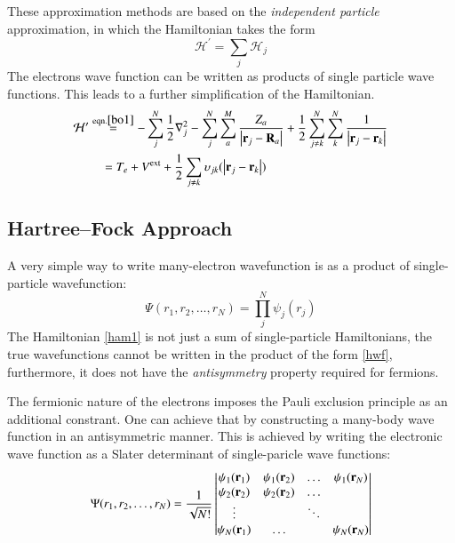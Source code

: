 These approximation methods are based on the \textit{independent particle} approximation, in which the Hamiltonian takes the form
\begin{equation}
	\mathcal{H}^{\prime} = \sum_j \mathcal{H}_j
\end{equation}
The electrons wave function can be written as products of single particle wave functions. This leads to a further simplification of the Hamiltonian. 
\begin{align}\label{ham1}
	\mathcal{H}^{\prime} & \stackrel{\text{eqn.} \ref{bo1}} = -\sum_j^N \frac{1}{2}\nabla^2_j - \sum_j^N\sum_a^M \frac{Z_a}{\abs{\vb{r}_j - \vb{R}_a}} + \frac{1}{2}\sum^N_{j\neq k}\sum^N_k\frac{1}{\abs{\vb{r}_j - \vb{r}_k}} \nonumber \\ 
	 &\quad  = T_e + V^{\text{ext}} + \frac{1}{2}\sum_{j\neq k} \upsilon_{jk}(\abs{\vb{r}_j - \vb{r}_k}) 
\end{align}



\subsection{Hartree--Fock Approach}
A very simple way to write many-electron wavefunction is as a product of single-particle wavefunction:
\begin{equation}\label{hwf}
\Psi(r_1,r_2,\dots,r_N) = \prod_j^N \psi_j(r_j)
\end{equation}
The Hamiltonian \eqref{ham1} is not just a sum of single-particle Hamiltonians, the true wavefunctions cannot be written in the product of the form \eqref{hwf}, furthermore, it does not have the \textit{antisymmetry} property required for fermions.

The fermionic nature of the electrons imposes the Pauli exclusion principle as an additional constrant. One can achieve that by constructing a many-body wave function in an antisymmetric manner. This is achieved by writing the electronic wave function as a Slater determinant of single-paricle wave functions:
\begin{equation}\label{hfwf}
\Psi(r_1,r_2,\dots,r_N) = \frac{1}{\sqrt{N!}}\begin{vmatrix}
\psi_1(\vb{r}_1) & \psi_1(\vb{r}_2) & \dots & \psi_1(\vb{r}_N) \\
\psi_2(\vb{r}_2) & \psi_2(\vb{r}_2) & \dots &					\\
\vdots			 &					& \ddots &					\\
\psi_N(\vb{r}_1) & \dots			&		 &  \psi_N(\vb{r}_N) 
\end{vmatrix}
\end{equation}

